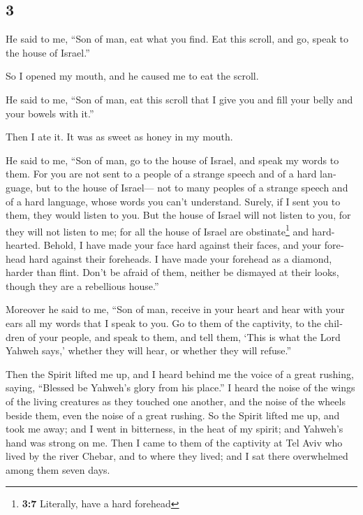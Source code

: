 \begin{paracol}{2}
\switchcolumn
\begin{otherlanguage}{english}

\hypertarget{section-5}{%
\section{3}\label{section-5}}

 He said to me, ``Son of man, eat what you find. Eat this
scroll, and go, speak to the house of Israel.''

 So I opened my mouth, and he caused me to eat the scroll.

 He said to me, ``Son of man, eat this scroll that I give
you and fill your belly and your bowels with it.''

Then I ate it. It was as sweet as honey in my mouth.

 He said to me, ``Son of man, go to the house of Israel,
and speak my words to them.  For you are not sent to a
people of a strange speech and of a hard language, but to the house of
Israel---  not to many peoples of a strange speech and of
a hard language, whose words you can't understand. Surely, if I sent you
to them, they would listen to you.  But the house of
Israel will not listen to you, for they will not listen to me; for all
the house of Israel are obstinate\footnote{\textbf{3:7} Literally, have
  a hard forehead} and hard-hearted.  Behold, I have made
your face hard against their faces, and your forehead hard against their
foreheads.  I have made your forehead as a diamond, harder
than flint. Don't be afraid of them, neither be dismayed at their looks,
though they are a rebellious house.''

 Moreover he said to me, ``Son of man, receive in your
heart and hear with your ears all my words that I speak to you.
 Go to them of the captivity, to the children of your
people, and speak to them, and tell them, `This is what the Lord Yahweh
says,' whether they will hear, or whether they will refuse.''

 Then the Spirit lifted me up, and I heard behind me the
voice of a great rushing, saying, ``Blessed be Yahweh's glory from his
place.''  I heard the noise of the wings of the living
creatures as they touched one another, and the noise of the wheels
beside them, even the noise of a great rushing.  So the
Spirit lifted me up, and took me away; and I went in bitterness, in the
heat of my spirit; and Yahweh's hand was strong on me. 
Then I came to them of the captivity at Tel Aviv who lived by the river
Chebar, and to where they lived; and I sat there overwhelmed among them
seven days.


\end{otherlanguage}
\end{paracol}
